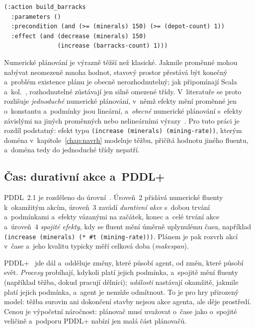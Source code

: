 \begin{lstlisting}[caption={Numerický operátor v~PDDL~2.1.},label=lst:numeric,float,basicstyle=\ttfamily\footnotesize]
(:action build_barracks
  :parameters ()
  :precondition (and (>= (minerals) 150) (>= (depot-count) 1))
  :effect (and (decrease (minerals) 150)
               (increase (barracks-count) 1)))
\end{lstlisting}

Numerické plánování je výrazně těžší než klasické. Jakmile proměnné mohou nabývat neomezeně mnoha hodnot, stavový prostor přestává být konečný a~problém existence plánu je obecně nerozhodnutelný; jak připomínají Scala a~kol.~\cite{Scala2020}, rozhodnutelné zůstávají jen silně omezené třídy. V~literatuře se proto rozlišuje \emph{jednoduché} numerické plánování, v~němž efekty mění proměnné jen o~konstantu a~podmínky jsou lineární, a~\emph{obecné} numerické plánování s~efekty závislými na jiných proměnných nebo nelineárními výrazy~\cite{Scala2016,Scala2020}. Pro tuto práci je rozdíl podstatný: efekt typu \texttt{(increase (minerals) (mining-rate))}, kterým doména v~kapitole~\ref{chap:navrh} modeluje těžbu, přičítá hodnotu jiného fluentu, a~doména tedy do jednoduché třídy nepatří.

\subsection{Čas: durativní akce a~PDDL+}

PDDL~2.1 je rozděleno do úrovní~\cite{FoxLong2003}. Úroveň~2 přidává numerické fluenty k~okamžitým akcím, úroveň~3 zavádí \emph{durativní akce} s~dobou trvání a~podmínkami a~efekty vázanými na začátek, konec a~celé trvání akce a~úroveň~4 \emph{spojité efekty}, kdy se fluent mění úměrně uplynulému času, například \texttt{(increase (minerals) (* \#t (mining-rate)))}. Plánem je pak rozvrh akcí v~čase a~jeho kvalitu typicky měří celková doba (\emph{makespan}).

PDDL+~\cite{FoxLong2006} jde dál a~odděluje změny, které působí agent, od změn, které působí svět. \emph{Procesy} probíhají, kdykoli platí jejich podmínka, a~spojitě mění fluenty (například těžba, dokud pracují dělníci); \emph{události} nastávají okamžitě, jakmile platí jejich podmínka, a~agent je nemůže odmítnout. To je pro hry přirozený model: těžba surovin ani dokončení stavby nejsou akce agenta, ale děje prostředí. Cenou je výpočetní náročnost: plánovač musí uvažovat o~čase jako o~spojité veličině a~podporu PDDL+ nabízí jen malá část plánovačů.

